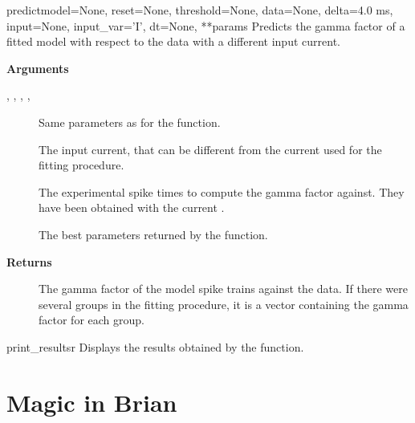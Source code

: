 \documentclass[letterpaper,10pt,english]{manual}
\begin{document}
\hypertarget{brian.library.modelfitting.predict}{}\begin{funcdesc}{predict}{model=None, reset=None, threshold=None, data=None, delta=4.0 ms, input=None, input\_var='I', dt=None, **params}
Predicts the gamma factor of a fitted model with respect to the data with
a different input current.

\textbf{Arguments}
\begin{description}
\item[, , , , ] \leavevmode
Same parameters as for the  function.

\item[] \leavevmode
The input current, that can be different from the current used for the fitting
procedure.

\item[] \leavevmode
The experimental spike times to compute the gamma factor against. They have
been obtained with the current .

\item[] \leavevmode
The best parameters returned by the  function.

\end{description}

\textbf{Returns}
\begin{description}
\item[] \leavevmode
The gamma factor of the model spike trains against the data.
If there were several groups in the fitting procedure, it is a vector
containing the gamma factor for each group.

\end{description}
\end{funcdesc}

\hypertarget{brian.library.modelfitting.print_results}{}\begin{funcdesc}{print\_results}{r}
Displays the results obtained by the  function.
\end{funcdesc}

\resetcurrentobjects
\hypertarget{--doc-reference-magic}{}

\hypertarget{index-89}{}\section{Magic in Brian}
\end{document}
